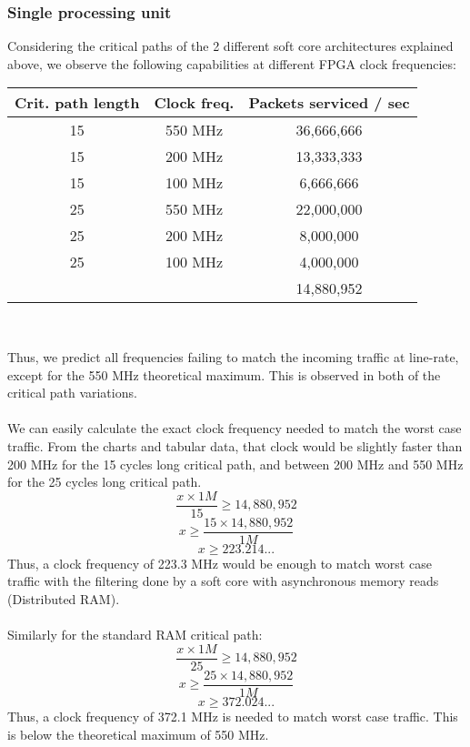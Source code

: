 \documentclass{l4proj}
\begin{document}
\subsubsection{Single processing unit}
Considering the critical paths of the 2 different soft core architectures explained above, we observe the following capabilities at different FPGA clock frequencies:
\begin{center}
\begin{tabular}{ |c|c|c| } 
 \hline
 \textbf{Crit. path length} & \textbf{Clock freq.} & \textbf{Packets serviced / sec} \\ 
 \hline
   15 & 550 MHz & 36,666,666\\
   15 & 200 MHz & 13,333,333\\
   15 & 100 MHz & 6,666,666\\
   25 & 550 MHz & 22,000,000\\
   25 & 200 MHz & 8,000,000\\
   25 & 100 MHz & 4,000,000\\
   \hline
    & & 14,880,952\\
 \hline
\end{tabular}\\
\end{center}
Thus, we predict all frequencies failing to match the incoming traffic at line-rate, except for the 550 MHz theoretical maximum. This is observed in both of the critical path variations.\\\\
We can easily calculate the exact clock frequency needed to match the worst case traffic. From the charts and tabular data, that clock would be slightly faster than 200 MHz for the 15 cycles long critical path, and between 200 MHz and 550 MHz for the 25 cycles long critical path.
\begin{equation}
 \frac{x \times 1M}{15} \geq 14,880,952\nonumber
\end{equation}
\begin{equation}
 x \geq \frac{15 \times 14,880,952}{1M}\nonumber
\end{equation}
\begin{equation}
 x \geq 223.214...\nonumber
\end{equation}
Thus, a clock frequency of 223.3 MHz would be enough to match worst case traffic with the filtering done by a soft core with asynchronous memory reads (Distributed RAM).\\\\
Similarly for the standard RAM critical path:
\begin{equation}
 \frac{x \times 1M}{25} \geq 14,880,952\nonumber
\end{equation}
\begin{equation}
 x \geq \frac{25 \times 14,880,952}{1M}\nonumber
\end{equation}
\begin{equation}
 x \geq 372.024...\nonumber
\end{equation}
Thus, a clock frequency of 372.1 MHz is needed to match worst case traffic. This is below the theoretical maximum of 550 MHz.
\end{document}
